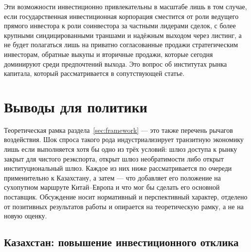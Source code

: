 \documentclass[12pt]{article}
\begin{document}
Эти возможности инвестиционно привлекательны в масштабе лишь в том случае, если
государственная инвестиционная корпорация сместится от роли ведущего прямого инвестора к
роли соинвестора за частными лидерами сделок, с более крупными синдицированными траншами и
надёжным выходом через листинг, а не будет полагаться лишь на приватно согласованные
продажи стратегическим инвесторам, обратные выкупы и вторичные продажи, которые сегодня
доминируют среди предпочтений выхода. Это вопрос об институтах рынка капитала, который
рассматривается в сопутствующей статье.

\section{Выводы для политики}\label{sec:policy}

Теоретическая рамка раздела~\ref{sec:framework} — это также перечень рычагов воздействия.
Шок спроса такого рода индустриализирует транзитную экономику лишь если выполняется хотя бы
одно из трёх условий: шлюз доступа к рынку закрыт для чистого реэкспорта, открыт шлюз
необратимости либо открыт институциональный шлюз. Каждое из них ниже рассматривается по
очереди применительно к Казахстану, а затем — что добавляет его положение на сухопутном
маршруте Китай--Европа и что мог бы сделать его основной поставщик. Обсуждение носит
нормативный и перспективный характер, отделено от позитивных результатов работы и опирается
на теоретическую рамку, а не на новую оценку.

\subsection{Казахстан: повышение инвестиционного отклика}
\end{document}
